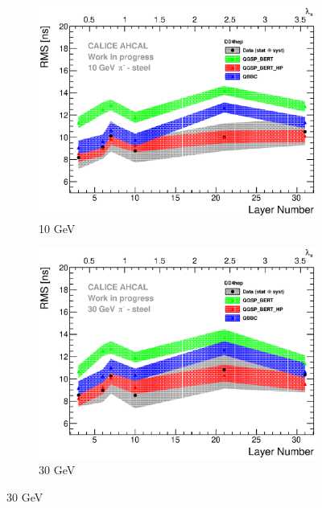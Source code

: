 \begin{figure}[htbp!]
  \begin{subfigure}[t]{0.49\textwidth}
    \centering
    \includegraphics[width=1\textwidth]{../Thesis_Plots/Timing/Pions/Plots/ComparisonToSim/RMS_Depth_10GeV_DD4hep.eps}
    \caption{10 GeV}\label{fig:Depth_RMS_SimData_10GeV_DD4hep}
  \end{subfigure}
  \hfill
  \begin{subfigure}[t]{0.49\textwidth}
    \centering
    \includegraphics[width=1\textwidth]{../Thesis_Plots/Timing/Pions/Plots/ComparisonToSim/RMS_Depth_30GeV_DD4hep.eps}
    \caption{30 GeV}\label{fig:Depth_RMS_SimData_30GeV_DD4hep}
  \end{subfigure}

\end{figure}
